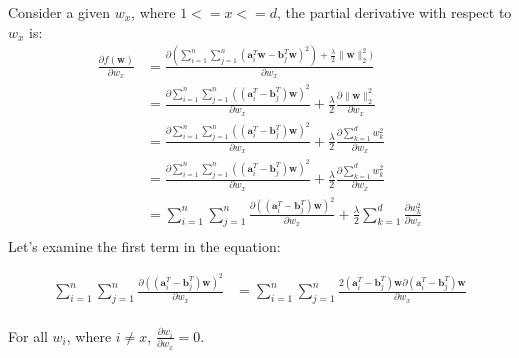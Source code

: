 \documentclass[12pt]{article}
\begin{document}
\begin{enumerate}[label=(\alph*)]
Consider a given \(w_x\), where \(1 <= x <= d\), the partial derivative with respect to \(w_x\) is:
\begin{equation}
\begin{matrix}
    \frac{\partial{f(\boldsymbol{w})}}{\partial{w_x}} &=
        \frac{\partial{(\sum_{i=1}^{n}\sum_{j=1}^{n}(\boldsymbol{a}_i^T
        \boldsymbol{w} - \boldsymbol{b}_j^T \boldsymbol{w})^2) + \frac{\lambda}{2}\|\boldsymbol{w}\|_2^2)}}{\partial{w_x}} \\
    &=  \frac{\partial{\sum_{i=1}^{n}\sum_{j=1}^{n}((\boldsymbol{a}_i^T
        - \boldsymbol{b}_j^T) \boldsymbol{w})^2}}
        {\partial{w_x}}
        + \frac{\lambda}{2}\frac{\partial{\|\boldsymbol{w}\|_2^2}}
        {\partial{w_x}}      \\
    &=  \frac{\partial{\sum_{i=1}^{n}\sum_{j=1}^{n}((\boldsymbol{a}_i^T
        - \boldsymbol{b}_j^T) \boldsymbol{w})^2}}
        {\partial{w_x}}
        + \frac{\lambda}{2}\frac{\partial{\sum_{k=1}^{d}w_k^2}}
        {\partial{w_x}}      \\
    &=  \frac{\partial{\sum_{i=1}^{n}\sum_{j=1}^{n}
        ((\boldsymbol{a}_i^T - \boldsymbol{b}_j^T) \boldsymbol{w})^2}}
        {\partial{w_x}}
        + \frac{\lambda}{2}\frac{\partial{\sum_{k=1}^{d}w_k^2}}
        {\partial{w_x}}      \\
    &=  \sum_{i=1}^{n}\sum_{j=1}^{n}
        \frac{\partial{((\boldsymbol{a}_i^T - \boldsymbol{b}_j^T) \boldsymbol{w})^2}}
        {\partial{w_x}}
        + \frac{\lambda}{2}\sum_{k=1}^{d}\frac{\partial{w_k^2}}
        {\partial{w_x}}      \\
\end{matrix}
\end{equation}
Let's examine the first term in the equation:

\begin{equation}
\begin{matrix}
    \sum_{i=1}^{n}\sum_{j=1}^{n}
        \frac{\partial{((\boldsymbol{a}_i^T - \boldsymbol{b}_j^T) \boldsymbol{w})^2}}
        {\partial{w_x}}
    &=  \sum_{i=1}^{n}\sum_{j=1}^{n}
        \frac{2(\boldsymbol{a}_i^T - \boldsymbol{b}_j^T)\boldsymbol{w} \partial{(\boldsymbol{a}_i^T - \boldsymbol{b}_j^T)\boldsymbol{w}}}
        {\partial{w_x}}    \\
\end{matrix}
\end{equation}

For all \(w_i\), where \( i \ne x\), \(\frac{\partial{w_i}} {\partial{w_x}} = 0\).


\end{enumerate}
\end{document}
